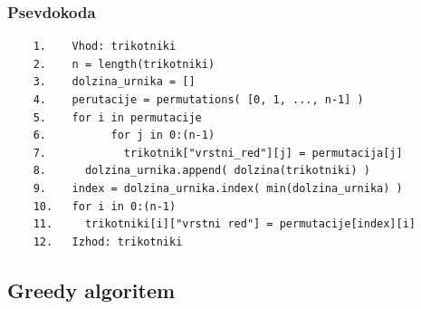 \documentclass[a4paper,12pt]{article}
\theoremstyle{definition}
\theoremstyle{plain}
\begin{document}
\subsubsection{Psevdokoda}
\begin{verbatim}
    1.    Vhod: trikotniki
    2.    n = length(trikotniki)
    3.    dolzina_urnika = []
    4.    perutacije = permutations( [0, 1, ..., n-1] )
    5.    for i in permutacije
    6.          for j in 0:(n-1)
    7.            trikotnik["vrstni_red"][j] = permutacija[j]
    8.      dolzina_urnika.append( dolzina(trikotniki) )
    9.    index = dolzina_urnika.index( min(dolzina_urnika) )
    10.   for i in 0:(n-1)
    11.     trikotniki[i]["vrstni red"] = permutacije[index][i]
    12.   Izhod: trikotniki

\end{verbatim}




\subsection{Greedy algoritem}
\end{document}
